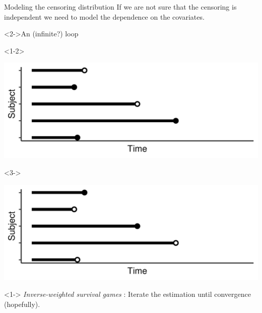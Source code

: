 \documentclass[smaller]{beamer}\usepackage{listings}
\begin{document}
\begin{frame}[label={sec:orgd7eb800}]{Modeling the censoring distribution}
\small If we are not sure that the censoring is independent we need to model the dependence on the
covariates. \vfill


\begin{block}<2->{\centering An (infinite?) loop}
\begin{onlyenv}<1-2>
\pause

\begin{center}
\includegraphics[width=.9\linewidth]{./fig-obs-data.pdf}
\end{center}
\end{onlyenv}

\begin{onlyenv}<3->
\begin{center}
\includegraphics[width=.9\linewidth]{./fig-inverse-data.pdf}
\end{center}
\end{onlyenv}
\end{block}


\begin{onlyenv}<1->
\pause \pause \emph{Inverse-weighted survival games} \citep{han2021inverse}: Iterate the estimation until
convergence (hopefully).
\end{onlyenv}
\end{frame}
\end{document}
